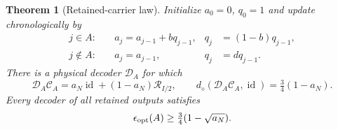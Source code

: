 \documentclass[11pt,a4paper]{article}
\newtheorem{theorem}{Theorem}
\newcommand{\id}{\operatorname{id}}
\newcommand{\dd}{d_\diamond}
\newcommand{\R}{\mathcal R}
\begin{document}
\begin{theorem}[Retained-carrier law]
Initialize $a_0=0$, $q_0=1$ and update chronologically by
\begin{align}
 j\in A:\quad &a_j=a_{j-1}+bq_{j-1},&q_j&=(1-b)q_{j-1},\label{eq:kept}\\
 j\notin A:\quad &a_j=a_{j-1},&q_j&=dq_{j-1}.\label{eq:lost}
\end{align}
There is a physical decoder $\mathcal D_A$ for which
\begin{equation}
 \mathcal D_A\mathcal C_A=a_N\id+(1-a_N)\R_{I/2},\qquad
 \dd(\mathcal D_A\mathcal C_A,\id)=\tfrac34(1-a_N).
 \label{eq:erasuredecoder}
\end{equation}
Every decoder of all retained outputs satisfies
\begin{equation}
 \epsilon_{\rm opt}(A)\ge\tfrac34(1-\sqrt{a_N}).\label{eq:erasurelower}
\end{equation}
\end{theorem}
\end{document}
